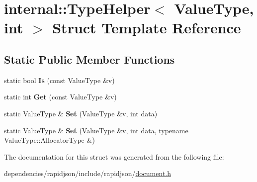 \hypertarget{structinternal_1_1_type_helper_3_01_value_type_00_01int_01_4}{}\section{internal\+:\+:Type\+Helper$<$ Value\+Type, int $>$ Struct Template Reference}
\label{structinternal_1_1_type_helper_3_01_value_type_00_01int_01_4}
\subsection*{Static Public Member Functions}
\begin{DoxyCompactItemize}
\item 
\mbox{\label{structinternal_1_1_type_helper_3_01_value_type_00_01int_01_4_aa17ef940501aac12fd7934ef979c607e}} 
static bool {\bfseries Is} (const Value\+Type \&v)
\item 
\mbox{\label{structinternal_1_1_type_helper_3_01_value_type_00_01int_01_4_a98c331ac026873b9ad4ba68e7bf28446}} 
static int {\bfseries Get} (const Value\+Type \&v)
\item 
\mbox{\label{structinternal_1_1_type_helper_3_01_value_type_00_01int_01_4_aceea0a0fac6684e53a9d9f66da4154cd}} 
static Value\+Type \& {\bfseries Set} (Value\+Type \&v, int data)
\item 
\mbox{\label{structinternal_1_1_type_helper_3_01_value_type_00_01int_01_4_a2ca21bedcaeaf0fffe913edb2fe1a66a}} 
static Value\+Type \& {\bfseries Set} (Value\+Type \&v, int data, typename Value\+Type\+::\+Allocator\+Type \&)
\end{DoxyCompactItemize}


The documentation for this struct was generated from the following file\+:\begin{DoxyCompactItemize}
\item 
dependencies/rapidjson/include/rapidjson/\hyperlink{document_8h}{document.\+h}\end{DoxyCompactItemize}
